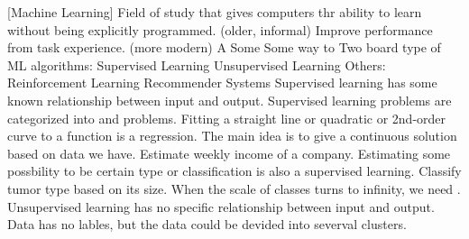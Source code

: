 \markdownRendererInterblockSeparator
{}\markdownRendererInterblockSeparator
{}[Machine Learning] Field of study that gives computers thr ability to learn without being explicitly programmed. (older, informal)\markdownRendererInterblockSeparator
{}Improve performance from task experience. (more modern)\markdownRendererInterblockSeparator
{}\markdownRendererUlBegin
\markdownRendererUlItem A \markdownRendererUlItemEnd 
\markdownRendererUlItem Some \markdownRendererUlItemEnd 
\markdownRendererUlItem Some way to \markdownRendererUlItemEnd 
\markdownRendererUlEnd \markdownRendererInterblockSeparator
{}Two board type of ML algorithms:\markdownRendererInterblockSeparator
{}\markdownRendererUlBegin
\markdownRendererUlItem Supervised Learning\markdownRendererUlItemEnd 
\markdownRendererUlItem Unsupervised Learning\markdownRendererUlItemEnd 
\markdownRendererUlEnd \markdownRendererInterblockSeparator
{}Others:\markdownRendererInterblockSeparator
{}\markdownRendererUlBegin
\markdownRendererUlItem Reinforcement Learning\markdownRendererUlItemEnd 
\markdownRendererUlItem Recommender Systems\markdownRendererUlItemEnd 
\markdownRendererUlEnd \markdownRendererInterblockSeparator
{}\markdownRendererInterblockSeparator
{}Supervised learning has some known relationship between input and output.\markdownRendererInterblockSeparator
{}Supervised learning problems are categorized into  and  problems.\markdownRendererInterblockSeparator
{}Fitting a straight line or quadratic or 2nd-order curve to a function is a regression. The main idea is to give a continuous solution based on data we have.\markdownRendererInterblockSeparator
{}Estimate weekly income of a company.\markdownRendererInterblockSeparator
{}Estimating some possbility to be certain type or classification is also a supervised learning.\markdownRendererInterblockSeparator
{}Classify tumor type based on its size.\markdownRendererInterblockSeparator
{}When the scale of classes turns to infinity, we need .\markdownRendererInterblockSeparator
{}\markdownRendererInterblockSeparator
{}Unsupervised learning has no specific relationship between input and output. Data has no lables, but the data could be devided into severval clusters.\markdownRendererInterblockSeparator
